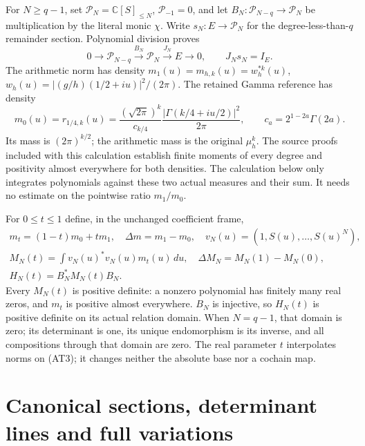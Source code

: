 \documentclass{article}
\newcommand{\C}{\mathbb C}
\newcommand{\cP}{\mathcal P}
\begin{document}
For $N\ge q-1$, set $\cP_N=\C[S]_{\le N}$,
$\cP_{-1}=0$, and let
$B_N:\cP_{N-q}\to\cP_N$ be multiplication by the literal monic
$\chi$. Write $s_N:E\to\cP_N$ for the degree-less-than-$q$
remainder section. Polynomial division proves
\[
 0\longrightarrow\cP_{N-q}\xrightarrow{B_N}\cP_N
       \xrightarrow{J_N}E\longrightarrow0,
 \qquad J_Ns_N=I_E.                         \tag{AT3}
\]
The arithmetic norm has density
$m_1(u)=m_{h,k}(u)=w_h^{*k}(u)$,
$w_h(u)=|(g/h)(1/2+iu)|^2/(2\pi)$.
The retained Gamma reference has density
\[
 m_0(u)=r_{1/4,k}(u)
 =\frac{(\sqrt{2\pi})^k}{c_{k/4}}
       \frac{|\Gamma(k/4+iu/2)|^2}{2\pi},
 \qquad c_a=2^{1-2a}\Gamma(2a).              \tag{AT4}
\]
Its mass is $(2\pi)^{k/2}$; the arithmetic mass is the original
$\mu_h^k$. The source proofs included with this calculation establish
finite moments of every degree and positivity almost everywhere for
both densities. The calculation below only integrates polynomials
against these two actual measures and their sum. It needs no estimate
on the pointwise ratio $m_1/m_0$.

For $0\le t\le1$ define, in the unchanged coefficient frame,
\[
 \begin{gathered}
 m_t=(1-t)m_0+tm_1,\quad \Delta m=m_1-m_0,
 \quad v_N(u)=(1,S(u),\ldots,S(u)^N),\\
 M_N(t)=\int v_N(u)^*v_N(u)m_t(u)\,du,
 \quad \Delta M_N=M_N(1)-M_N(0),\\
 H_N(t)=B_N^*M_N(t)B_N.                     \end{gathered}
 \tag{AT5}
\]
Every $M_N(t)$ is positive definite: a nonzero polynomial has finitely
many real zeros, and $m_t$ is positive almost everywhere. $B_N$ is
injective, so $H_N(t)$ is positive definite on its actual relation
domain. When $N=q-1$, that domain is zero; its determinant is one,
its unique endomorphism is its inverse, and all compositions through
that domain are zero. The real parameter $t$ interpolates norms on
(AT3); it changes neither the absolute base nor a cochain map.

\section{Canonical sections, determinant lines and full variations}
\end{document}
